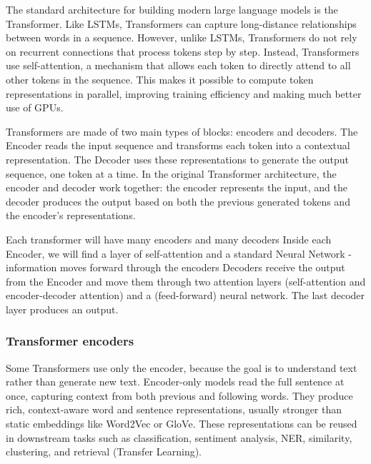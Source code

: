 The standard architecture for building modern large language models is the
Transformer.
Like LSTMs, Transformers can capture long-distance relationships between words in a
sequence. However, unlike LSTMs, Transformers do not rely on recurrent connections
that process tokens step by step.
Instead, Transformers use self-attention, a mechanism that allows each token to
directly attend to all other tokens in the sequence. This makes it possible to compute
token representations in parallel, improving training efficiency and making much
better use of GPUs.

\vspace{10pt}

Transformers are made of two main types of blocks: encoders and decoders.
The Encoder reads the input sequence and transforms each token into a contextual
representation.
The Decoder uses these representations to generate the output sequence, one token at
a time.
In the original Transformer architecture, the encoder and decoder work together: the
encoder represents the input, and the decoder produces the output based on both the
previous generated tokens and the encoder's representations.


\vspace{10pt}

Each transformer will have many encoders and many decoders
Inside each Encoder, we will find a layer of self-attention and a standard
Neural Network - information moves forward through the encoders
Decoders receive the output from the Encoder and move them through two
attention layers (self-attention and encoder-decoder attention) and a
(feed-forward) neural network. The last decoder layer produces an output.



\subsubsection{Transformer encoders}

Some Transformers use only the encoder, because the goal is to understand text
rather than generate new text.
Encoder-only models read the full sentence at once, capturing context from both
previous and following words.
They produce rich, context-aware word and sentence representations, usually stronger
than static embeddings like Word2Vec or GloVe.
These representations can be reused in downstream tasks such as classification,
sentiment analysis, NER, similarity, clustering, and retrieval (Transfer Learning).

